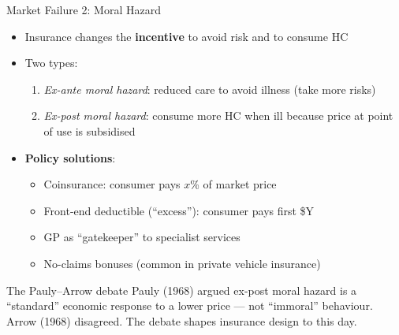 \documentclass[aspectratio=169, 12pt]{beamer}
\begin{document}
\begin{frame}{Market Failure 2: Moral Hazard}
  \begin{itemize}
    \item Insurance changes the \textbf{incentive} to avoid risk and to consume HC
    \item Two types:
    \begin{enumerate}
      \item \textit{Ex-ante moral hazard}: reduced care to avoid illness (take more risks)
      \item \textit{Ex-post moral hazard}: consume more HC when ill because price at point
            of use is subsidised
    \end{enumerate}
    \item \textbf{Policy solutions}:
    \begin{itemize}
      \item Coinsurance: consumer pays $x$\% of market price
      \item Front-end deductible (``excess''): consumer pays first \$Y
      \item GP as ``gatekeeper'' to specialist services
      \item No-claims bonuses (common in private vehicle insurance)
    \end{itemize}
  \end{itemize}
  \begin{alertblock}{The Pauly--Arrow debate}
    Pauly (1968) argued ex-post moral hazard is a ``standard'' economic response to a lower
    price --- not ``immoral'' behaviour. Arrow (1968) disagreed. The debate shapes insurance
    design to this day.
  \end{alertblock}
\end{frame}
\end{document}
